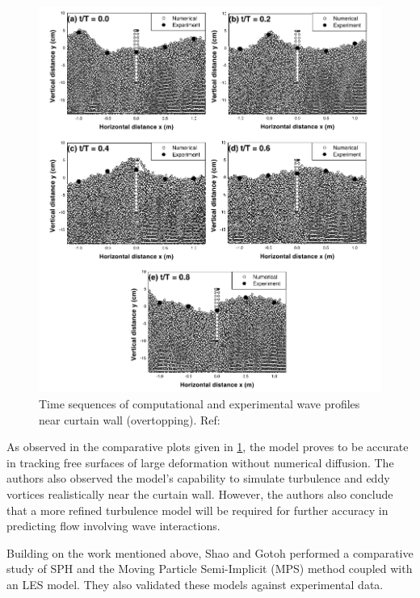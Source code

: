 \begin{figure}[h!]
	\centering
	\includegraphics[scale=0.8]{Figures/research_papers/gotoh2004-wave-profile-result.png}
	\caption{Time sequences of computational and experimental wave profiles near curtain wall (overtopping). Ref: \parencite{Gotoh2004}}
	\label{fig:gotoh2004-wave-profile-result}
\end{figure}

As observed in the comparative plots given in \ref{fig:gotoh2004-wave-profile-result}, the model proves to be accurate in tracking free surfaces of large deformation without numerical diffusion. The authors also observed the model's capability to simulate turbulence and eddy vortices realistically near the curtain wall. However, the authors also conclude that a more refined turbulence model will be required for further accuracy in predicting flow involving wave interactions.

Building on the work mentioned above, Shao and Gotoh \parencite{Shao2005} performed a comparative study of SPH and the Moving Particle Semi-Implicit (MPS) method coupled with an LES model. They also validated these models against experimental data.

